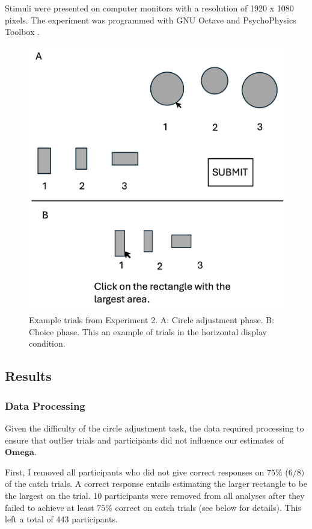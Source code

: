 Stimuli were presented on computer monitors with a resolution of 1920 x 1080 pixels. The experiment was programmed with GNU Octave \parencite{octave} and PsychoPhysics Toolbox \parencite{brainardPsychophysicsToolbox1997}. 

\begin{figure}
   \includegraphics[width=\linewidth]{figures/circle_exp_display.jpg}
   \caption{Example trials from Experiment 2. A: Circle adjustment phase. B: Choice phase. This an example of trials in the horizontal display condition.}
   \label{fig:circle_exp_display}
\end{figure}

\subsection{Results}
\subsubsection{Data Processing}
Given the difficulty of the circle adjustment task, the data required processing to ensure that outlier trials and participants did not influence our estimates of $\mathbf{Omega}$.

First, I removed all participants who did not give correct responses on $75\%$ ($6/8)$ of the catch trials. A correct response entails estimating the larger rectangle to be the largest on the trial. 10 participants were removed from all analyses after they failed to achieve at least $75\%$ correct on catch trials (see below for details). This left a total of 443 participants.

